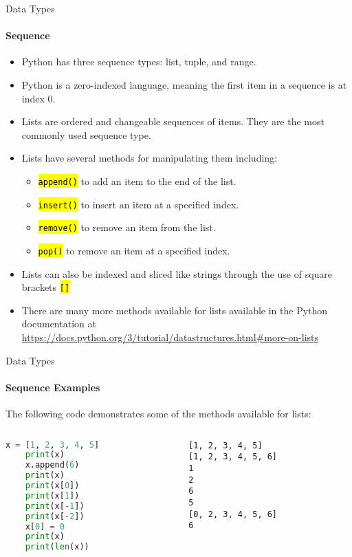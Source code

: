 \documentclass[
    aspectratio=169, 
    usepdftitle=false, 
    xcolor={dvipsnames},
    hyperref={
        colorlinks,
        linkcolor=black,
        urlcolor=blue}
    ]{beamer}
\let\OldTexttt\texttt
\renewcommand{\texttt}[1]{\OldTexttt{\hl{#1}}}%
\begin{document}
\begin{frame}[fragile]{Data Types}
    \framesubtitle{Sequence}
    \begin{itemize}
        \item Python has three sequence types: list, tuple, and range.
        \item Python is a zero-indexed language, meaning the first item in a sequence is at index 0.
        \item Lists are ordered and changeable sequences of items. They are the most commonly used sequence type.
        \item Lists have several methods for manipulating them including:
              \begin{itemize}
                  \item \texttt{append()} to add an item to the end of the list.
                  \item \texttt{insert()} to insert an item at a specified index.
                  \item \texttt{remove()} to remove an item from the list.
                  \item \texttt{pop()} to remove an item at a specified index.
              \end{itemize}
        \item Lists can also be indexed and sliced like strings through the use of square brackets \texttt{[]}
        \item There are many more methods available for lists available in the Python documentation at \url{https://docs.python.org/3/tutorial/datastructures.html#more-on-lists}
    \end{itemize}
\end{frame}

\begin{frame}[fragile]{Data Types}
    \framesubtitle{Sequence Examples}
    The following code demonstrates some of the methods available for lists:
    \begin{columns}
        \begin{column}{0.5\textwidth}
            \begin{lstlisting}[language=Python]
    x = [1, 2, 3, 4, 5]
    print(x)
    x.append(6)
    print(x)
    print(x[0])
    print(x[1])
    print(x[-1])
    print(x[-2])
    x[0] = 0
    print(x)
    print(len(x))
    \end{lstlisting}
        \end{column}
        \begin{column}{0.4\textwidth}
            \begin{lstlisting}[style=output]
[1, 2, 3, 4, 5]
[1, 2, 3, 4, 5, 6]
1
2
6
5
[0, 2, 3, 4, 5, 6]
6
            \end{lstlisting}
        \end{column}
    \end{columns}
\end{frame}
\end{document}
